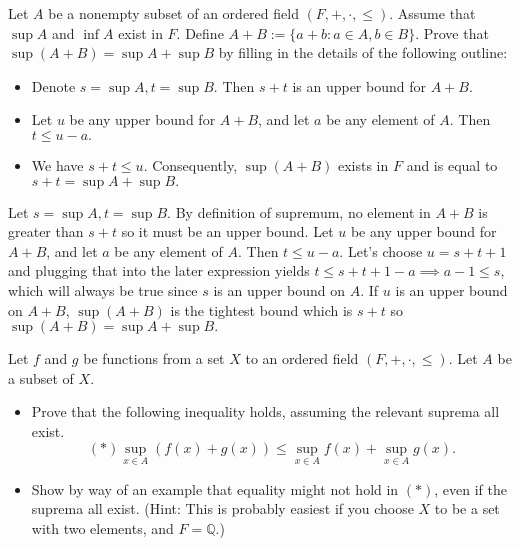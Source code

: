 \documentclass[12pt,letterpaper,boxed]{hmcpset}
\begin{document}
\begin{problem}[Exercise 2.4]
Let $A$ be a nonempty subset of an ordered field $(F,+,\cdot,\leq)$. Assume that $\sup A$ and $\inf A$ exist in $F.$ Define $A + B := \{ a + b : a \in A, b \in B \}.$ Prove that $\sup(A + B) = \sup A + \sup B$ by filling in the details of the following outline: 
\vspace{-2mm}
\begin{itemize}
	\itemsep0em
	\item Denote $s = \sup A, t = \sup B.$ Then $s + t$ is an upper bound for $A + B.$
	\item Let $u$ be any upper bound for $A + B$, and let $a$ be any element of $A$. Then $t \leq u - a.$
	\item We have $s+t \leq u.$ Consequently, $\sup(A + B)$ exists in $F$ and is equal to $s + t = \sup A + \sup B.$ 
\end{itemize}
\end{problem}

\begin{solution}
Let $s = \sup A, t = \sup B.$ By definition of supremum, no element in $A + B$ is greater than $s + t$ so it must be an upper bound.  Let $u$ be any upper bound for $A + B$, and let $a$ be any element of $A$. Then $t \leq u - a.$ Let's choose $u=s+t+1$ and plugging that into the later expression yields $t \leq s + t + 1 - a \implies a - 1 \leq s$, which will always be true since $s$ is an upper bound on $A$. If $u$ is an upper bound on $A+B$, $\sup(A+B)$ is the tightest bound which is $s + t$ so $\sup(A+B) = \sup A + \sup B.$ 
\end{solution}

\begin{problem}[Exercise 2.5.]
Let $f$ and $g$ be functions from a set $X$ to an ordered field $(F,+,\cdot,\leq).$ Let $A$ be a subset of $X.$
\begin{itemize}
	\itemsep0em
	\item Prove that the following inequality holds, assuming the relevant suprema all exist. $$(*) \sup_{x \in A}(f(x) + g(x)) \leq \sup_{x \in A}f(x) + \sup_{x\in A}g(x).$$
	\item Show by way of an example that equality might not hold in $(*)$, even if the suprema all exist. (Hint: This is probably easiest if you choose $X$ to be a set with two elements, and $F=\mathbb{Q}$.)
\end{itemize}

\end{problem}
\end{document}
